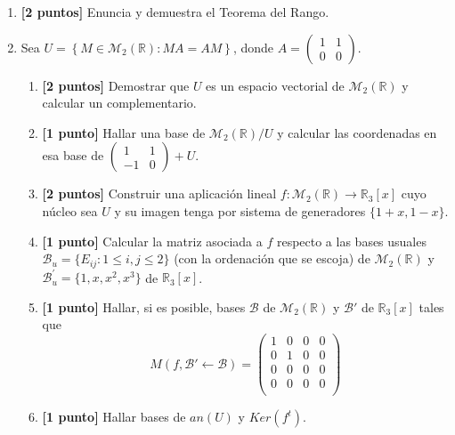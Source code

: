 \documentclass[12pt]{article}
\begin{document}
    \begin{enumerate}
    \item \textbf{[2 puntos]} Enuncia y demuestra el Teorema del Rango.

    \item Sea $\displaystyle U = \left\{ M \in \mathcal{M}_2(\mathbb{R}) : MA = AM \right\}$, donde $\displaystyle A = \left( \begin{array}{cc}
        1 & 1 \\
        0 & 0
    \end{array}\right)$.

    \begin{enumerate}
        \addtolength{\itemsep}{1em}
        \item \textbf{[2 puntos]} Demostrar que $U$ es un espacio vectorial de $\mathcal{M}_2(\mathbb{R})$ y calcular un complementario.

        \item \textbf{[1 punto]} Hallar una base de $\mathcal{M}_2(\mathbb{R})/U$ y calcular las coordenadas en esa base de $\displaystyle \left( \begin{array}{cc}
        1 & 1 \\
        -1 & 0
        \end{array} \right) + U$.

        \item \textbf{[2 puntos]} Construir una aplicación lineal $f:\mathcal{M}_2(\mathbb{R}) \to \mathbb{R}_3[x]$ cuyo núcleo sea $U$ y su imagen tenga por sistema de generadores $\{1+x, 1-x\}$.

        \item \textbf{[1 punto]} Calcular la matriz asociada a $f$ respecto a las bases usuales $\mathcal{B}_u=\{E_{ij}:1\leq i,j\leq2\}$ (con la ordenación que se escoja) de $\mathcal{M}_2(\mathbb{R})$ y $\mathcal{B}_{u}^{'} = \{1,x,x^2,x^3\}$ de $\mathbb{R}_3[x]$.

        \item \textbf{[1 punto]} Hallar, si es posible, bases $\mathcal{B}$ de $\mathcal{M}_2(\mathbb{R})$ y $\mathcal{B}'$ de $\mathbb{R}_3[x]$ tales que
        \begin{equation*}
            M(f, \mathcal{B}' \longleftarrow \mathcal{B}) = \left( \begin{array}{cccc}
                1 & 0 & 0 & 0 \\
                0 & 1 & 0 & 0 \\
                0 & 0 & 0 & 0 \\
                0 & 0 & 0 & 0 \\
            \end{array} \right)
        \end{equation*}

        \item \textbf{[1 punto]} Hallar bases de $an(U)$ y $Ker(f^t)$.

    \end{enumerate}
\end{enumerate}
\end{document}
